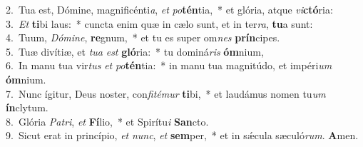 {2.~}Tua est, Dómine, magnificénti\textit{a}, \textit{et} \textit{po}\textbf{tén}tia,~* et glória, atque \textit{vi}\textbf{ctó}ria:\\
{3.~}\textit{Et} \textbf{ti}bi laus:~* cuncta enim quæ in cælo sunt, et in ter\textit{ra}, \textbf{tu}a sunt:\\
{4.~}Tuum, \textit{Dó}\textit{mi}\textit{ne}, \textbf{re}gnum,~* et tu es super om\textit{nes} \textbf{prín}cipes.\\
{5.~}Tuæ divítiæ, et \textit{tu}\textit{a} \textit{est} \textbf{gló}ria:~* tu dominá\textit{ris} \textbf{óm}nium,\\
{6.~}In manu tua vir\textit{tus} \textit{et} \textit{po}\textbf{tén}tia:~* in manu tua magnitúdo, et impéri\textit{um} \textbf{óm}nium.\\
{7.~}Nunc ígitur, Deus noster, con\textit{fi}\textit{té}\textit{mur} \textbf{ti}bi,~* et laudámus nomen tu\textit{um} \textbf{ín}clytum.\\
{8.~}Glória \textit{Pa}\textit{tri}, \textit{et} \textbf{Fí}lio,~* et Spirítu\textit{i} \textbf{San}cto.\\
{9.~}Sicut erat in princípio, \textit{et} \textit{nunc}, \textit{et} \textbf{sem}per,~* et in sǽcula sæculó\textit{rum}. \textbf{A}men.\\
